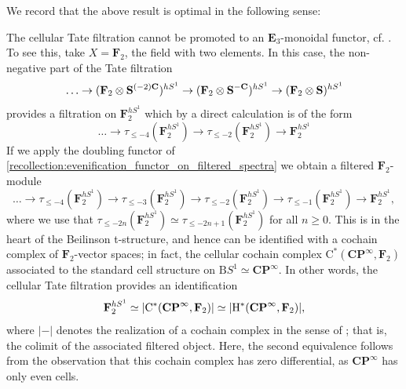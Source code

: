 \documentclass[oneside,a4paper]{amsart}
\begin{document}
We record that the above result is optimal in the following sense: 
\begin{warning}
\label{warning:tate_filtration_cannot_be_made_e3_monoidal}
The cellular Tate filtration cannot be promoted to an $\mathbf{E}_{3}$-monoidal functor, cf. \cite[{Warning 6.1.8}]{bhatt-lurie:apc}. To see this, take $X = \mathbf{F}_{2}$, the field with two elements. In this case, the non-negative part of the Tate filtration 
\[
\ldots \rightarrow (\mathbf{F}_{2} \otimes \mathbf{S}^{(-2)\mathbf{C}})^{hS^{1}} \rightarrow (\mathbf{F}_{2} \otimes \mathbf{S}^{-\mathbf{C}})^{hS^{1}}  \rightarrow (\mathbf{F}_{2} \otimes \mathbf{S})^{hS^{1}} 
\]
provides a filtration on $\mathbf{F}_{2}^{hS^{1}}$ which by a direct calculation is of the form 
\[
\ldots \rightarrow \tau_{\leq -4}(\mathbf{F}_{2}^{hS^{1}}) \rightarrow \tau_{\leq -2}(\mathbf{F}_{2}^{hS^{1}}) \rightarrow \mathbf{F}_{2}^{hS^{1}} 
\]
If we apply the doubling functor of \cref{recollection:evenification_functor_on_filtered_spectra} we obtain a filtered $\mathbf{F}_{2}$-module 
\[
\ldots \rightarrow \tau_{\leq -4}(\mathbf{F}_{2}^{hS^{1}}) \rightarrow \tau_{\leq -3}(\mathbf{F}_{2}^{hS^{1}}) \rightarrow \tau_{\leq -2}(\mathbf{F}_{2}^{hS^{1}}) \rightarrow \tau_{\leq -1}(\mathbf{F}_{2}^{hS^{1}}) \rightarrow \mathbf{F}_{2}^{hS^{1}},
\]
where we use that $\tau_{\leq -2n}(\mathbf{F}_{2}^{hS^{1}}) \simeq \tau_{\leq -2n+1}(\mathbf{F}_{2}^{hS^{1}})$ for all $n \geq 0$. This is in the heart of the Beilinson t-structure, and hence can be identified with a cochain complex of $\mathbf{F}_{2}$-vector spaces; in fact, the cellular cochain complex $\mathrm{C}^{\ast}(\mathbf{CP}^{\infty}, \mathbf{F}_{2})$ associated  to the standard cell structure on $\mathrm{B}S^{1} \simeq \mathbf{CP}^{\infty}$. In other words, the cellular Tate filtration provides an identification 
\begin{equation}
\label{equation:equivalence_between_f2hs1_and_a_realization_the_cellular_cochain_complex}
\mathbf{F}_{2}^{hS^{1}} \simeq | \mathrm{C}^{\ast}(\mathbf{CP}^{\infty}, \mathbf{F}_{2}) | \simeq | \mathrm{H}^{\ast}(\mathbf{CP}^{\infty}, \mathbf{F}_{2}) |,
\end{equation}
where $| - |$ denotes the realization of a cochain complex in the sense of \cite[{Construction 3.28}]{antieau:decalage}; that is, the colimit of the associated filtered object. Here, the second equivalence follows from the observation that this cochain complex has zero differential, as $\mathbf{CP}^{\infty}$ has only even cells. 


\end{warning}
\end{document}
